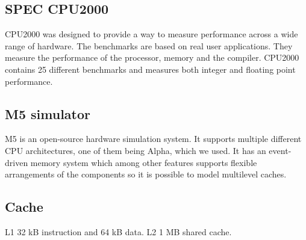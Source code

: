 \subsection{SPEC CPU2000}
CPU2000 was designed to provide a way to measure performance across
a wide range of hardware. The benchmarks are based on real user
applications. They measure the performance of the processor, memory
and the compiler. CPU2000 contains 25 different benchmarks and
measures both integer and floating point performance.
\cite {bib:cpu2000}

\subsection{M5 simulator}
M5 is an open-source hardware simulation system. It supports multiple
different CPU architectures, one of them being Alpha, which we used.
It has an event-driven memory system which among other features supports
flexible arrangements of the components so it is possible to model
multilevel caches.
\cite{bib:m5}

\subsection{Cache}

L1 32 kB instruction and 64 kB data.
L2 1 MB shared cache.


